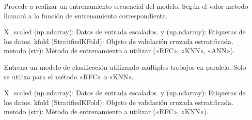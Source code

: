 \documentclass[letterpaper,10pt,spanish]{sphinxmanual}
\begin{document}
\begin{fulllineitems}
\label{\detokenize{Reduccion_Dimension:Seleccion_ejecucion.multiproceso}}
\pysigstartsignatures
\pysiglinewithargsret
{}
{\sphinxparamcomma {}\sphinxparamcomma {}\sphinxparamcomma {}}
{}
\pysigstopsignatures
\sphinxAtStartPar
Procede a realizar un entrenamiento secuencial del modelo.
Según el valor metodo llamará a la función de entrenamiento correspondiente.
\begin{description}
\sphinxAtStartPar
X\_scaled (np.ndarray): Datos de entrada escalados.
y (np.ndarray): Etiquetas de los datos.
kfold (StratifiedKFold): Objeto de validación cruzada estratificada.
metodo (str): Método de entrenamiento a utilizar («RFC», «KNN», «ANN»).

\end{description}

\end{fulllineitems}


\begin{fulllineitems}
\label{\detokenize{Reduccion_Dimension:Seleccion_ejecucion.n_jobs}}
\pysigstartsignatures
\pysiglinewithargsret
{}
{\sphinxparamcomma {}\sphinxparamcomma {}\sphinxparamcomma {}}
{}
\pysigstopsignatures
\sphinxAtStartPar
Entrena un modelo de clasificación utilizando múltiples trabajos en paralelo.
Solo se utiliza para el método «RFC» o «KNN».
\begin{description}
\sphinxAtStartPar
X\_scaled (np.ndarray): Datos de entrada escalados.
y (np.ndarray): Etiquetas de los datos.
kfold (StratifiedKFold): Objeto de validación cruzada estratificada.
metodo (str): Método de entrenamiento a utilizar («RFC», «KNN»).

\end{description}

\end{fulllineitems}

\end{document}
